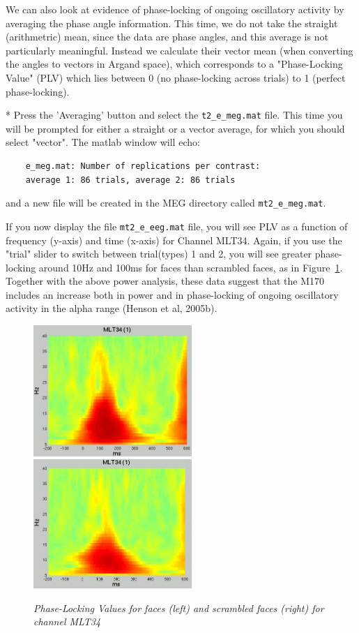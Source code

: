 We can also look at evidence of phase-locking of ongoing oscillatory activity by averaging the phase angle information. This time, we do not take the straight (arithmetric) mean, since the data are phase angles, and this average is not particularly meaningful. Instead we calculate their vector mean (when converting the angles to
vectors in Argand space), which corresponds to a "Phase-Locking Value" (PLV) which lies between 0 (no phase-locking across trials) to 1 (perfect phase-locking).

* Press the 'Averaging' button and select the \verb!t2_e_meg.mat! file. This time you will be prompted for either a straight or a vector average, for which you should select "vector". The matlab window will echo:
\begin{verbatim}
    e_meg.mat: Number of replications per contrast:
    average 1: 86 trials, average 2: 86 trials
\end{verbatim}
    and a new file will be created in the MEG directory called \verb!mt2_e_meg.mat!.

If you now display the file \verb!mt2_e_eeg.mat! file, you will see PLV as a function of frequency (y-axis) and time (x-axis) for Channel MLT34. Again, if you use the "trial" slider to switch between trial(types) 1 and 2, you will see greater phase-locking around 10Hz and 100ms for faces than scrambled faces, as in Figure~\ref{fig_32_14}. Together with the above power analysis, these data suggest that the M170 includes an increase both in power and in phase-locking of ongoing oscillatory activity in the alpha range (Henson et al, 2005b).


\begin{figure}
\begin{center}
\includegraphics[width=60mm]{multimodal/figures/figure_32_14_L}
\includegraphics[width=60mm]{multimodal/figures/figure_32_14_R}
\caption{\em Phase-Locking Values for faces (left) and scrambled faces (right) for channel MLT34 \label{fig_32_14}}
\end{center}
\end{figure}

